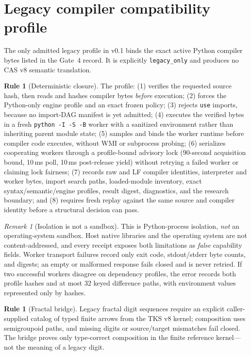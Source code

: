 \documentclass[11pt]{amsart}
\theoremstyle{definition}
\newtheorem{ruleenv}[theorem]{Rule}
\theoremstyle{remark}
\newtheorem{remark}[theorem]{Remark}
\begin{document}
\section{Legacy compiler compatibility profile}

The only admitted legacy profile in v0.1 binds the exact active Python compiler bytes listed in the Gate~4 record. It is explicitly \texttt{legacy\_only} and produces no CAS v8 semantic translation.

\begin{ruleenv}[Deterministic closure]\label{rule:closure}
The profile: (1) verifies the requested source hash, then reads and hashes compiler bytes \emph{before} execution; (2) forces the Python-only engine profile and an exact frozen policy; (3) rejects \texttt{use} imports, because no import-DAG manifest is yet admitted; (4) executes the verified bytes in a fresh \texttt{python -I -S -B} worker with a sanitized environment rather than inheriting parent module state; (5) samples and binds the worker runtime before compiler code executes, without WMI or subprocess probing; (6) serializes cooperating workers through a profile-bound advisory lock (90-second acquisition bound, 10\,ms poll, 10\,ms post-release yield) without retrying a failed worker or claiming lock fairness; (7) records raw and LF compiler identities, interpreter and worker bytes, import search paths, loaded-module inventory, exact syntax/semantic/engine profiles, result digest, diagnostics, and the research boundary; and (8) requires fresh replay against the same source and compiler identity before a structural decision can pass.
\end{ruleenv}

\begin{remark}[Isolation is not a sandbox]
This is Python-process isolation, \emph{not} an operating-system sandbox. Host native libraries and the operating system are not content-addressed, and every receipt exposes both limitations as \emph{false} capability fields. Worker transport failures record only exit code, stdout/stderr byte counts, and digests; an empty or malformed response fails closed and is never retried. If two successful workers disagree on dependency profiles, the error records both profile hashes and at most 32 keyed difference paths, with environment values represented only by hashes.
\end{remark}

\begin{ruleenv}[Fractal bridge]
Legacy fractal digit sequences require an explicit caller-supplied catalog of typed finite arrows from the TKS v8 kernel; composition uses semigroupoid paths, and missing digits or source/target mismatches fail closed. The bridge proves only type-correct composition in the finite reference kernel---not the meaning of a legacy digit.
\end{ruleenv}
\end{document}
